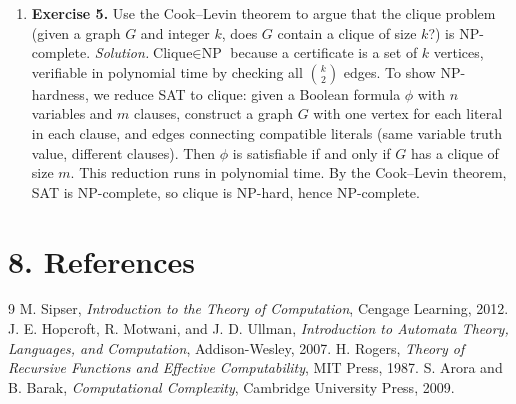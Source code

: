 \begin{enumerate}[leftmargin=*,itemsep=0.9em]
\item \textbf{Exercise 5.} Use the Cook--Levin theorem to argue that the clique problem (given a graph $G$ and integer $k$, does $G$ contain a clique of size $k$?) is NP-complete. \emph{Solution.}$\text{Clique} \in \text{NP}$ because a certificate is a set of $k$ vertices, verifiable in polynomial time by checking all $\binom{k}{2}$ edges. To show NP-hardness, we reduce SAT to clique: given a Boolean formula $\phi$ with $n$ variables and $m$ clauses, construct a graph $G$ with one vertex for each literal in each clause, and edges connecting compatible literals (same variable truth value, different clauses). Then $\phi$ is satisfiable if and only if $G$ has a clique of size $m$. This reduction runs in polynomial time. By the Cook--Levin theorem, SAT is NP-complete, so clique is NP-hard, hence NP-complete.

\end{enumerate}
\section*{8. References}
\begin{thebibliography}{9}
 M. Sipser, \emph{Introduction to the Theory of Computation}, Cengage Learning, 2012.
 J. E. Hopcroft, R. Motwani, and J. D. Ullman, \emph{Introduction to Automata Theory, Languages, and Computation}, Addison-Wesley, 2007.
 H. Rogers, \emph{Theory of Recursive Functions and Effective Computability}, MIT Press, 1987.
 S. Arora and B. Barak, \emph{Computational Complexity}, Cambridge University Press, 2009.
\end{thebibliography}
